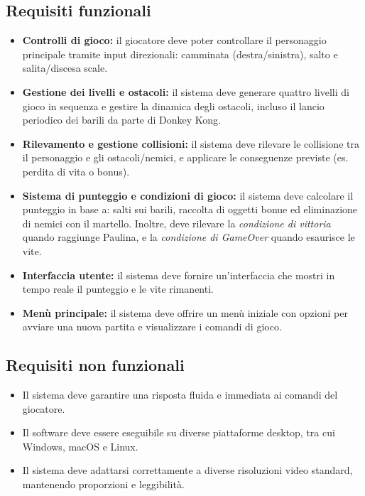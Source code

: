 \documentclass[a4paper,12pt]{report}
\begin{document}
\subsection*{Requisiti funzionali}
\begin{itemize}
	\item \textbf{Controlli di gioco:}
	      il giocatore deve poter controllare il personaggio principale tramite input direzionali: camminata (destra/sinistra), salto e salita/discesa scale.
	\item \textbf{Gestione dei livelli e ostacoli:}
	      il sistema deve generare quattro livelli di gioco in sequenza e gestire la dinamica degli ostacoli, incluso il lancio periodico dei barili da parte di Donkey Kong.
	\item \textbf{Rilevamento e gestione collisioni:}
	      il sistema deve rilevare le collisione tra il personaggio e gli ostacoli/nemici, e applicare le conseguenze previste (es. perdita di vita o bonus).
	\item  \textbf{Sistema di punteggio e condizioni di gioco:}
	      il sistema deve calcolare il punteggio in base a: salti sui barili, raccolta di oggetti bonue ed eliminazione di nemici con il martello.
	      Inoltre, deve rilevare la \textit{condizione di vittoria} quando raggiunge Paulina, e la \textit{condizione di GameOver} quando esaurisce le vite.
	\item \textbf{Interfaccia utente:}
	      il sistema deve fornire un'interfaccia che mostri in tempo reale il punteggio e  le vite rimanenti.
	\item \textbf{Menù principale:}
	      il sistema deve offrire un menù iniziale con opzioni per avviare una nuova partita e visualizzare i comandi di gioco.
\end{itemize}

\subsection*{Requisiti non funzionali}
\begin{itemize}
	\item Il sistema deve garantire una risposta fluida e immediata ai comandi del giocatore.
	\item Il software deve essere eseguibile su diverse piattaforme desktop, tra cui Windows, macOS e Linux.
	\item Il sistema deve adattarsi correttamente a diverse risoluzioni video standard, mantenendo proporzioni e leggibilità.
\end{itemize}
\end{document}
